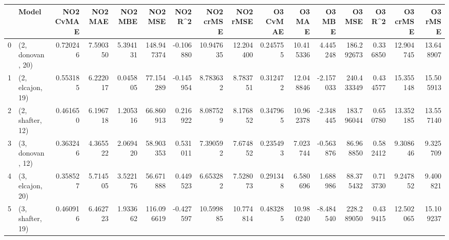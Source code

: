 \begin{tabular}{llrrrrrrrrrrrrrr}
\toprule
{} &             Model &  NO2 CvMAE &   NO2 MAE &   NO2 MBE &     NO2 MSE &   NO2 R\textasciicircum2 &  NO2 crMSE &   NO2 rMSE &  O3 CvMAE &     O3 MAE &    O3 MBE &      O3 MSE &    O3 R\textasciicircum2 &   O3 crMSE &    O3 rMSE \\
\midrule
0 &  (2, donovan, 20) &   0.720246 &  7.590350 &  5.394131 &  148.947374 & -0.106880 &  10.947635 &  12.204400 &  0.245755 &  10.415336 &  4.445248 &  186.292673 &  0.336850 &  12.904745 &  13.648907 \\
1 &  (2, elcajon, 19) &   0.553185 &  6.222017 &  0.045805 &   77.154289 & -0.145954 &   8.783632 &   8.783751 &  0.312472 &  12.048846 & -2.157033 &  240.433349 &  0.434577 &  15.355148 &  15.505913 \\
2 &  (2, shafter, 12) &   0.461650 &  6.196718 &  1.205316 &   66.860913 &  0.216922 &   8.087529 &   8.176852 &  0.347965 &  10.962378 & -2.348445 &  183.796044 &  0.650780 &  13.352185 &  13.557140 \\
3 &  (3, donovan, 12) &   0.363246 &  4.365522 &  2.069420 &   58.903353 &  0.531011 &   7.390592 &   7.674852 &  0.235493 &   7.023744 & -0.563876 &   86.968850 &  0.582412 &   9.308646 &   9.325709 \\
4 &  (3, elcajon, 20) &   0.358527 &  5.714505 &  3.522176 &   56.671888 &  0.449523 &   6.653282 &   7.528073 &  0.291348 &   6.580696 &  1.688986 &   88.375432 &  0.713730 &   9.247852 &   9.400821 \\
5 &  (3, shafter, 19) &   0.460916 &  6.462723 &  1.933662 &  116.096619 & -0.427597 &  10.599885 &  10.774814 &  0.483285 &  10.980240 & -8.484540 &  228.289050 &  0.439415 &  12.502065 &  15.109237 \\
\bottomrule
\end{tabular}
